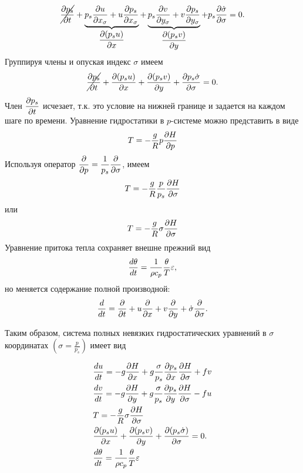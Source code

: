 \begin{equation*}
    \cancel{\displaystyle\frac{\partial p_s}{\partial t}} + 
    \underbrace{p_s\displaystyle\frac{\partial u}{\partial x_{\sigma}} + u\displaystyle\frac{\partial p_s}{\partial x_{\sigma}}}_{\displaystyle\frac{\partial (p_su)}{\partial x}} + 
    \underbrace{p_s\displaystyle\frac{\partial v}{\partial y_{\sigma}} + v\displaystyle\frac{\partial p_s}{\partial y_{\sigma}}}_{\displaystyle\frac{\partial (p_sv)}{\partial y}} + 
    p_s\displaystyle\frac{\partial \dot{\sigma}}{\partial \sigma} = 0.
\end{equation*}
Группируя члены и опуская индекс $\sigma$ имеем
\begin{equation}
    \label{eq:consm2}
    \cancel{\pd{p_s}{t}} + \pd{(p_su)}{x} + \pd{(p_sv)}{y} + \pd{p_s\dot{\sigma}}{\sigma} = 0.
\end{equation}
{\color{red} Член $\displaystyle\frac{\partial p_s}{\partial t}$ исчезает, т.к. это условие на нижней границе и задается на каждом шаге по времени.}
Уравнение гидростатики в $p$-системе можно представить в виде
\begin{equation*}
    T=-\frac{g}{R}p\displaystyle\frac{\partial H}{\partial p}
\end{equation*}
Используя оператор $\displaystyle\frac{\partial }{\partial p}=\frac{1}{p_s}\displaystyle\frac{\partial }{\partial \sigma}$, имеем
\begin{equation*}
    T=-\frac{g}{R}\frac{p}{p_s} \displaystyle\frac{\partial H}{\partial \sigma}
\end{equation*}
или 
\begin{equation}
    T=-\frac{g}{R}\sigma\displaystyle\frac{\partial H}{\partial \sigma}
\end{equation}
Уравнение притока тепла сохраняет внешне прежний вид
\begin{equation*}
    \displaystyle\frac{d \theta}{d t}=\frac{1}{\rho c_p}\frac{\theta}{T}\varepsilon,
\end{equation*}
но меняется содержание полной производной:
\begin{equation}
    \label{eq:td2sigma}
    \td{}{t}=\pd{}{t}+u\pd{}{x}+v\pd{}{y}+\dot{\sigma}\pd{}{\sigma}.
\end{equation}

Таким образом, система полных невязких гидростатических уравнений в $\sigma$ координатах $ \left( \sigma=\frac{p}{p_s} \right)$ имеет вид

\begin{align}
    \label{eq:dudt2sigma}
    &\td{u}{t} = -g\pd{H}{x}+g\frac{\sigma}{p_s}\pd{p_s}{x}\pd{H}{\sigma}+fv \\
    \label{eq:dvdt2sigma}
    &\td{v}{t} = -g\pd{H}{y}+g\frac{\sigma}{p_s}\pd{p_s}{y}\pd{H}{\sigma}-fu \\
    \label{eq:hydrostat2sigma}
    &T=-\frac{g}{R}\sigma\pd{H}{\sigma} \\
    \label{eq:consm2sigma}
    &\pd{(p_su)}{x} + \pd{(p_sv)}{y} + \pd{(p_s\dot{\sigma})}{\sigma} = 0. \\
    \label{eq:temp2sigma}
    &\td{\theta}{t}=\frac{1}{\rho c_p}\frac{\theta}{T}\varepsilon 
\end{align}

